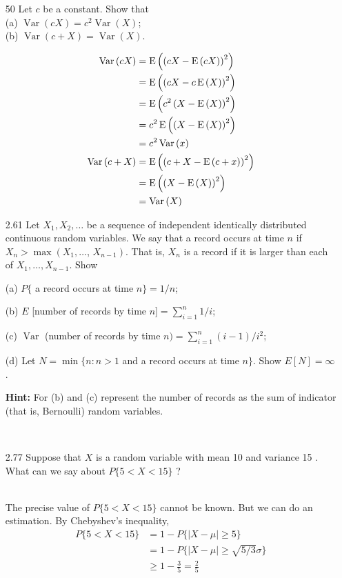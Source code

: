 \documentclass[en,hazy,blue,12pt,device = normal]{elegantnote}
\begin{document}
\begin{enumerate}
    \item[50]Let $c$ be a constant. Show that\\
    (a) $\operatorname{Var}(c X)=c^2 \operatorname{Var}(X)$;\\
    (b) $\operatorname{Var}(c+X)=\operatorname{Var}(X)$.
    \begin{tcolorbox}
        \begin{align*}
            \operatorname{Var}\left(cX\right) &= \operatorname E\left(\left(cX - \operatorname E\left(cX\right)\right)^2\right) \\
            &=  \operatorname E\left(\left(cX - c\operatorname E\left(X\right)\right)^2\right) \\
            &= \operatorname E\left(c^2\left(X - \operatorname E\left(X\right)\right)^2\right) \\
            &= c^2\operatorname E\left(\left(X - \operatorname E\left(X\right)\right)^2\right) \\
            &= c^2\operatorname{Var}\left(x\right)\\
            \operatorname{Var}\left(c+X\right) &= \operatorname E\left(\left(c+X - \operatorname E\left(c+x\right)\right)^2\right)\\
            &= \operatorname E\left(\left(X-\operatorname E\left(X\right)\right)^2\right) \\
            &= \operatorname{Var}\left(X\right)
        \end{align*}
    \end{tcolorbox}

    \item[2.61] Let $X_1, X_2, \ldots$ be a sequence of independent identically distributed continuous random variables. We say that a record occurs at time $n$ if $X_n>\max \left(X_1, \ldots\right.$, $\left.X_{n-1}\right)$. That is, $X_n$ is a record if it is larger than each of $X_1, \ldots, X_{n-1}$. Show
    
    (a) $P\{$ a record occurs at time $n\}=1 / n$;

    (b) $E$ [number of records by time $n]=\sum_{i=1}^n 1 / i$;

    (c) $\operatorname{Var}$ (number of records by time $n)=\sum_{i=1}^n(i-1) / i^2$;

    (d) Let $N=\min \{n: n>1$ and a record occurs at time $n\}$. Show $E[N]=\infty$.

    {\bf Hint:} For (b) and (c) represent the number of records as the sum of indicator (that is, Bernoulli) random variables.

    \begin{tcolorbox}
        \sol\\
    \end{tcolorbox}

    \item[2.77] Suppose that $X$ is a random variable with mean 10 and variance 15 . What can we say about $P\{5<X<15\}$ ?
    \begin{tcolorbox}
        \sol\\
        The precise value of \(P\{5<X<15\}\) cannot be known. But we can do an estimation. By Chebyshev's inequality,
        \begin{align*}
            P\{5<X<15\} &= 1 - P\{|X - \mu| \geq 5\} \\
            &= 1 - P\{|X - \mu | \geq \sqrt{5/3}\sigma\} \\
            &\geq 1 - \frac 3 5 = \frac 2 5
        \end{align*}
    \end{tcolorbox}


\end{enumerate}
\end{document}
